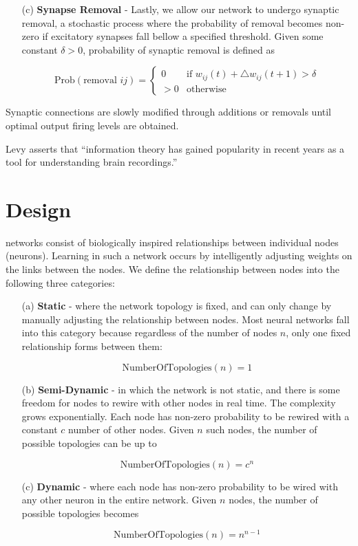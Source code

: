 \documentclass[journal]{./sty/IEEEtran}
\begin{document}
\begin{itemize}
\item[(c)] {\bf Synapse Removal} -
Lastly, we allow our network to undergo synaptic removal, a stochastic process where the probability of removal becomes non-zero if excitatory synapses fall bellow a specified threshold.
Given some constant \(\delta > 0\), probability of synaptic removal is defined as

\[
\text{Prob}(\text{removal } ij) = \left\{
     \begin{array}{lr}
       0 & \text{if } w_{ij}(t) + \triangle w_{ij}(t+1) > \delta\\
       >0 & \text{otherwise}
     \end{array}
   \right.
\]

\end{itemize}

Synaptic connections are slowly modified through additions or removals until optimal output firing levels are obtained. 

Levy asserts that  ``information theory has gained popularity in recent years as a tool for understanding brain recordings.''


\section{Design}
 networks consist of biologically inspired relationships between individual nodes (neurons). Learning in such a network occurs by intelligently adjusting weights on the links between the nodes. We define the relationship between nodes into the following three categories:

\begin{itemize}
\item[(a)] {\bf Static} - where the network topology is fixed, and can only change by manually adjusting the relationship between nodes. Most neural networks fall into this category because regardless of the number of nodes \(n\), only one fixed relationship forms between them:

\[
\text{NumberOfTopologies}(n) = 1
\]


\item[(b)] {\bf Semi-Dynamic} - in which the network is not static, and there is some freedom for nodes to rewire with other nodes in real time. The complexity grows exponentially. Each node has non-zero probability to be rewired with a constant \(c\) number of other nodes. Given \(n\) such nodes, the number of possible topologies can be up to

\[
\text{NumberOfTopologies}(n) = c^n
\]


\item[(c)] {\bf Dynamic} - where each node has non-zero probability to be wired with any other neuron in the entire network. Given \(n\) nodes, the number of possible topologies becomes

\[
\text{NumberOfTopologies}(n) = n^{n-1}
\]


\end{itemize}
\end{document}
